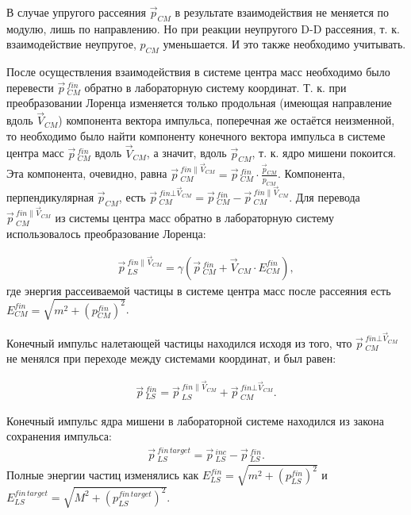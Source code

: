 \documentclass[a4paper,12pt]{article}
\begin{document}
\begin{large}
	В случае упругого рассеяния $\vec{p}_{CM}$ в результате взаимодействия не меняется по модулю, лишь по направлению.
	Но при реакции неупругого D-D рассеяния, т. к. взаимодействие неупругое, $p_{CM}$ уменьшается.
	И это также необходимо учитывать. 
	
	После осуществления взаимодействия в системе центра масс необходимо было перевести $\vec{p}\,^{fin}_{CM}$ обратно в лабораторную систему координат.
	Т. к. при преобразовании Лоренца изменяется только продольная (имеющая направление вдоль $\vec{V}_{CM}$) компонента вектора импульса, поперечная же остаётся неизменной, то необходимо было найти компоненту конечного вектора импульса в системе центра масс $\vec{p}\,^{fin}_{CM}$ вдоль $\vec{V}_{CM}$, а значит, вдоль $\vec{p}_{CM}$, т. к. ядро мишени покоится.
	Эта компонента, очевидно, равна $\vec{p}\,^{fin \parallel \vec{V}_{CM}}_{CM}=\vec{p}\,^{fin}_{CM} \cdot \frac{\vec{p}_{CM}}{p_{CM}}$.
	Компонента, перпендикулярная $\vec{p}_{CM}$, есть $\vec{p}\,^{fin \bot \vec{V}_{CM}}_{CM}=\vec{p}\,^{fin}_{CM}-\vec{p}\,^{fin \parallel \vec{V}_{CM}}_{CM}$.
	Для перевода $\vec{p}\,^{fin \parallel \vec{V}_{CM}}_{CM}$ из системы центра масс обратно в лабораторную систему использовалось преобразование Лоренца:
	
\begin{equation}
\label{MSlsincMomentumAfter}
\begin{aligned} 
  \vec{p}\,_{LS}^{fin \parallel \vec{V}_{CM}} = \gamma \left( \vec{p}\,^{fin}_{CM} + \vec{V}_{CM} \cdot E^{fin}_{CM} \right),
\end{aligned}
\end{equation}
	где энергия рассеиваемой частицы в системе центра масс после рассеяния есть $E^{fin}_{CM}=\sqrt{m^2+\left( p^{fin}_{CM} \right)^2}$.
	
	Конечный импульс налетающей частицы находился исходя из того, что $\vec{p}\,^{fin \bot \vec{V}_{CM}}_{CM}$ не менялся при переходе между системами координат, и был равен:
	
\begin{equation}
\label{LSincMomentumAfter}
\begin{aligned} 
  \vec{p}\,_{LS}^{fin} = \vec{p}\,_{LS}^{fin \parallel \vec{V}_{CM}} + \vec{p}\,^{fin \bot \vec{V}_{CM}}_{CM}.
\end{aligned}
\end{equation}	
	
	Конечный импульс ядра мишени в лабораторной системе находился из закона сохранения импульса:
\begin{equation}
\label{LStargetMomentumAfter}
\begin{aligned} 
  \vec{p}\,_{LS}^{fin\,target} = \vec{p}\,_{LS}^{inc} - \vec{p}\,_{LS}^{fin}.
\end{aligned}
\end{equation}
	Полные энергии частиц изменялись как $E_{LS}^{fin}=\sqrt{m^2+\left( p_{LS}^{fin} \right)^2 }$ и $E_{LS}^{fin\,target}=\sqrt{M^2+\left( p_{LS}^{fin\,target} \right)^2 }$.
  

\end{large}
\end{document}
